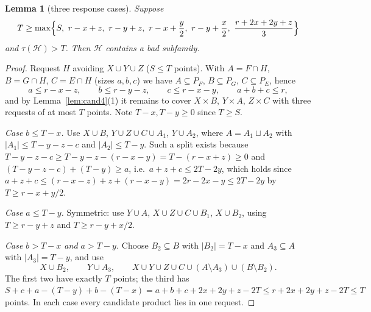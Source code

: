 \documentclass[11pt]{amsart}
\newtheorem{lemma}[theorem]{Lemma}
\theoremstyle{definition}
\theoremstyle{remark}
\newcommand{\cH}{\mathcal H}
\begin{document}
\begin{lemma}[three response cases]\label{lem:L26}
Suppose
\[
T\ge\max\Bigl\{S,\ r-x+z,\ r-y+z,\ r-x+\frac y2,\ r-y+\frac x2,\ \frac{r+2x+2y+z}{3}\Bigr\}
\]
and $\tau(\cH)>T$. Then $\cH$ contains a bad subfamily.
\end{lemma}
\begin{proof}
Request $H$ avoiding $X\cup Y\cup Z$ ($S\le T$ points). With $A=F\cap H$, $B=G\cap H$, $C=E\cap H$ (sizes $a,b,c$) we have $A\subseteq P_F$, $B\subseteq P_G$, $C\subseteq P_E$, hence
\[
a\le r-x-z,\qquad b\le r-y-z,\qquad c\le r-x-y,\qquad a+b+c\le r,
\]
and by Lemma~\ref{lem:cand4}(1) it remains to cover $X\times B$, $Y\times A$, $Z\times C$ with three requests of at most $T$ points. Note $T-x,T-y\ge0$ since $T\ge S$.

\emph{Case $b\le T-x$.} Use $X\cup B$, $Y\cup Z\cup C\cup A_1$, $Y\cup A_2$, where $A=A_1\sqcup A_2$ with $|A_1|\le T-y-z-c$ and $|A_2|\le T-y$. Such a split exists because $T-y-z-c\ge T-y-z-(r-x-y)=T-(r-x+z)\ge0$ and $(T-y-z-c)+(T-y)\ge a$, i.e.\ $a+z+c\le 2T-2y$, which holds since $a+z+c\le(r-x-z)+z+(r-x-y)=2r-2x-y\le 2T-2y$ by $T\ge r-x+y/2$.

\emph{Case $a\le T-y$.} Symmetric: use $Y\cup A$, $X\cup Z\cup C\cup B_1$, $X\cup B_2$, using $T\ge r-y+z$ and $T\ge r-y+x/2$.

\emph{Case $b>T-x$ and $a>T-y$.} Choose $B_2\subseteq B$ with $|B_2|=T-x$ and $A_3\subseteq A$ with $|A_3|=T-y$, and use
\[
X\cup B_2,\qquad Y\cup A_3,\qquad X\cup Y\cup Z\cup C\cup(A\setminus A_3)\cup(B\setminus B_2).
\]
The first two have exactly $T$ points; the third has $S+c+a-(T-y)+b-(T-x)=a+b+c+2x+2y+z-2T\le r+2x+2y+z-2T\le T$ points. In each case every candidate product lies in one request.
\end{proof}
\end{document}
